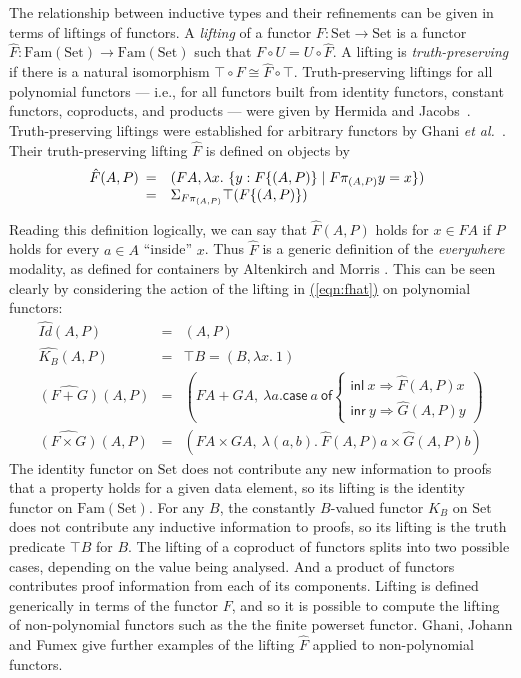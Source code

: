 \documentclass{LMCS}
\newcommand{\sepbar}{\mathrel|}
\newcommand{\Fam}{\mathrm{Fam}}
\newcommand{\Set}{\mathrm{Set}}
\newcommand{\parenref}[1]{\hyperref[#1]{(\ref*{#1})}}
\begin{document}
The relationship between inductive types and their refinements can be
given in terms of liftings of functors. A {\em lifting} of a functor
$F : \Set \to \Set$ is a functor $\hat{F} : \Fam(\Set) \to \Fam(\Set)$
such that $F \circ U = U \circ \hat{F}$.  A lifting is {\em
  truth-preserving} if there is a natural isomorphism $\top \circ F
\cong \hat{F} \circ \top$. Truth-preserving liftings for all
polynomial functors --- i.e., for all functors built from identity
functors, constant functors, coproducts, and products --- were given
by Hermida and Jacobs~\cite{hermida98structural}.  Truth-preserving
liftings were established for arbitrary functors by Ghani \emph{et
  al.}~\cite{ghani10induction}.  Their truth-preserving lifting
$\hat{F}$ is defined on objects by
\begin{equation}
  \label{eqn:fhat}
  \hat{F}(A,P)
  \begin{array}[t]{cl}
    = & (FA, \lambda x.\ \{ y : F \{ (A,P)\} \sepbar F\pi_{(A,P)} y = x \}) \\
    = & \Sigma_{F\pi_{(A,P)}} \top(F \{(A,P)\})
  \end{array}
\end{equation}

\noindent
Reading this definition logically, we can say that $\hat{F}(A,P)$
holds for $x \in FA$ if $P$ holds for every $a \in A$ ``inside''
$x$. Thus $\hat{F}$ is a generic definition of the \emph{everywhere}
modality, as defined for containers by Altenkirch and Morris
\cite{alten09indexed}. This can be seen clearly by considering the
action of the lifting in \parenref{eqn:fhat} on polynomial functors:
\[\begin{array}{lcl}
  \widehat{Id}(A, P) &=&(A,P)\\
  \widehat{K_B}(A, P) &=&\top B = (B, \lambda x.\ 1)\\
  \widehat{(F+G)}(A, P) & = & \left(FA+GA, \ \lambda a. \mathsf{case}\ a\ \mathsf{ of}
    \left\{
   \begin{array}{l}
     \mathsf{inl}\ x \Rightarrow \hat{F}(A,P)x \\
     \mathsf{inr}\ y \Rightarrow \hat{G}(A,P)y
   \end{array}
 \right.\right)\\
 \widehat{(F \times G)}(A, P)
 & = &  (FA \times GA, \ \lambda (a,b).\ \hat{F}(A, P)a \times
 \hat{G}(A, P)b)  
\end{array}\]
The identity functor on $\Set$ does not contribute any new information
to proofs that a property holds for a given data element, so its
lifting is the identity functor on $\Fam(\Set)$. For any $B$, the
constantly $B$-valued functor $K_B$ on $\Set$ does not contribute any
inductive information to proofs, so its lifting is the truth predicate
$\top B$ for $B$. The lifting of a coproduct of functors splits into
two possible cases, depending on the value being analysed. And a
product of functors contributes proof information from each of its
components. Lifting is defined generically in terms of the functor
$F$, and so it is possible to compute the lifting of non-polynomial
functors such as the the finite powerset functor. Ghani, Johann and
Fumex \cite{ghani10induction} give further examples of the lifting
$\hat{F}$ applied to non-polynomial functors.
\end{document}
